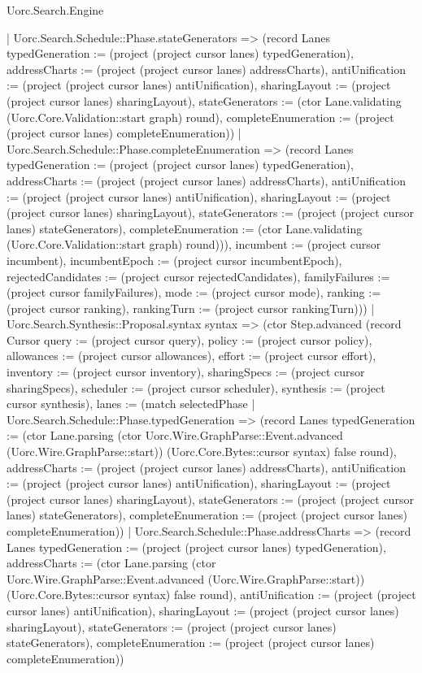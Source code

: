 \begin{lexlean}{Uorc.Search.Engine}
\begin{semanticmodule}
{{      | Uorc.Search.Schedule::Phase.stateGenerators => (record Lanes {typedGeneration := (project (project cursor lanes) typedGeneration), addressCharts := (project (project cursor lanes) addressCharts), antiUnification := (project (project cursor lanes) antiUnification), sharingLayout := (project (project cursor lanes) sharingLayout), stateGenerators := (ctor Lane.validating (Uorc.Core.Validation::start graph) round), completeEnumeration := (project (project cursor lanes) completeEnumeration)})
      | Uorc.Search.Schedule::Phase.completeEnumeration => (record Lanes {typedGeneration := (project (project cursor lanes) typedGeneration), addressCharts := (project (project cursor lanes) addressCharts), antiUnification := (project (project cursor lanes) antiUnification), sharingLayout := (project (project cursor lanes) sharingLayout), stateGenerators := (project (project cursor lanes) stateGenerators), completeEnumeration := (ctor Lane.validating (Uorc.Core.Validation::start graph) round)})), incumbent := (project cursor incumbent), incumbentEpoch := (project cursor incumbentEpoch), rejectedCandidates := (project cursor rejectedCandidates), familyFailures := (project cursor familyFailures), mode := (project cursor mode), ranking := (project cursor ranking), rankingTurn := (project cursor rankingTurn)}))
    | Uorc.Search.Synthesis::Proposal.syntax syntax => (ctor Step.advanced (record Cursor {query := (project cursor query), policy := (project cursor policy), allowances := (project cursor allowances), effort := (project cursor effort), inventory := (project cursor inventory), sharingSpecs := (project cursor sharingSpecs), scheduler := (project cursor scheduler), synthesis := (project cursor synthesis), lanes := (match selectedPhase
      | Uorc.Search.Schedule::Phase.typedGeneration => (record Lanes {typedGeneration := (ctor Lane.parsing (ctor Uorc.Wire.GraphParse::Event.advanced (Uorc.Wire.GraphParse::start)) (Uorc.Core.Bytes::cursor syntax) false round), addressCharts := (project (project cursor lanes) addressCharts), antiUnification := (project (project cursor lanes) antiUnification), sharingLayout := (project (project cursor lanes) sharingLayout), stateGenerators := (project (project cursor lanes) stateGenerators), completeEnumeration := (project (project cursor lanes) completeEnumeration)})
      | Uorc.Search.Schedule::Phase.addressCharts => (record Lanes {typedGeneration := (project (project cursor lanes) typedGeneration), addressCharts := (ctor Lane.parsing (ctor Uorc.Wire.GraphParse::Event.advanced (Uorc.Wire.GraphParse::start)) (Uorc.Core.Bytes::cursor syntax) false round), antiUnification := (project (project cursor lanes) antiUnification), sharingLayout := (project (project cursor lanes) sharingLayout), stateGenerators := (project (project cursor lanes) stateGenerators), completeEnumeration := (project (project cursor lanes) completeEnumeration)})
}}
\end{semanticmodule}
\end{lexlean}
